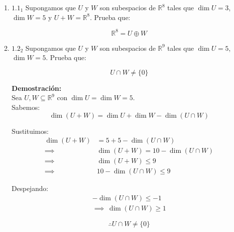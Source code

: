 \documentclass{article}
\begin{document}
		\begin{enumerate}
			
			\item \(1.1_1\) 
			Supongamos que \(U\) y \(W\) son subespacios de \(\mathbb{R}^8\) tales que \(\dim U=3\), \(\dim W=5\) y \(U+W=\mathbb{R}^8\). Prueba que:
			
			\begin{equation*}
				\mathbb{R}^8 = U \oplus W
			\end{equation*}
			
			
			\item \(1.2_2\) 
			Supongamos que \(U\) y \(W\) son subespacios de \(\mathbb{R}^9\) tales que \(\dim U=5\), \(\dim W=5\). Prueba que:
			
			\begin{equation*}
				U \cap W \neq \{0\}
			\end{equation*}
			
			\textbf{Demostración:}\\
			
			Sea \( U, W \subseteq \mathbb{R}^9\) con \(\dim U = \dim W = 5\).\\
			
			Sabemos:
			\begin{equation*}
				\dim(U+W) = \dim U + \dim W - \dim(U \cap W)
			\end{equation*}
			
			Sustituimos:
			\begin{equation*}
				\begin{aligned}
					\dim(U+W) &= 5 + 5 - \dim(U \cap W) \\
					\implies\ & \dim(U+W) = 10 - \dim(U \cap W) \\
					\implies\ & \dim(U+W) \leq 9 \\
					\implies\ & 10 - \dim(U \cap W) \leq 9
				\end{aligned}
			\end{equation*}
			
			Despejando:
			\begin{equation*}
				\begin{aligned}
					-\dim(U \cap W) \le -1 \\
					\implies\  \dim(U \cap W) \ge 1
				\end{aligned}
			\end{equation*}
			
			\begin{equation*}
				\boxed{\therefore U \cap W \neq \{0\}}
			\end{equation*}
			
		\end{enumerate}
		
\end{document}
